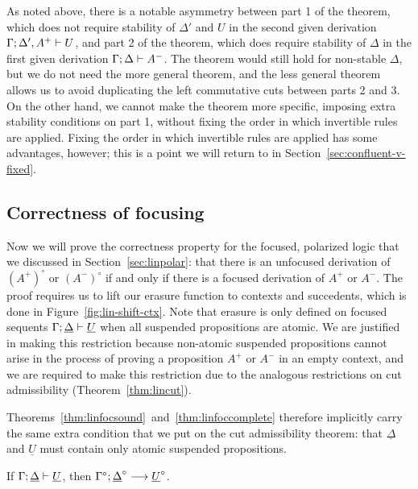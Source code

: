 As noted above, there is a notable asymmetry between part 1 of the
theorem, which does not require stability of $\Delta'$ and $U$ in the
second given derivation ${\Gamma};{\Delta',A^+} \vdash {U} \mathstrut$, and part 2
of the theorem, which does require stability of $\Delta$ in the first
given derivation ${\Gamma};{\Delta} \vdash {A^-} \mathstrut$. The theorem would
still hold for non-stable $\Delta$, but we do not need the more
general theorem, and the less general theorem allows us to avoid
duplicating the left commutative cuts between parts 2 and 3. On the
other hand, we cannot make the theorem more specific, imposing extra
stability conditions on part 1, without fixing the order in which
invertible rules are applied. Fixing the order in which invertible
rules are applied has some advantages, however; this is a point we
will return to in Section~\ref{sec:confluent-v-fixed}.

\subsection{Correctness of focusing}
\label{sec:lincorrectness}



Now we will prove the correctness property for the focused, polarized
logic that we discussed in Section~\ref{sec:linpolar}: that there is
an unfocused derivation of $(A^+)^\circ$ or $(A^-)^\circ$ if and only
if there is a focused derivation of $A^+$ or $A^-$.  The proof
requires us to lift our erasure function to contexts and succedents,
which is done in Figure~\ref{fig:lin-shift-ctx}. Note that erasure is
only defined on focused sequents
${\Gamma};{\underline{\Delta}} \vdash {\underline{U}} \mathstrut$ when all
suspended propositions are atomic. We are justified in making this
restriction because non-atomic suspended propositions cannot arise in
the process of proving a proposition $A^+$ or $A^-$ in an empty
context, and we are required to make this restriction due to the
analogous restrictions on cut admissibility
(Theorem~\ref{thm:lincut}).

Theorems~\ref{thm:linfocsound}~and~\ref{thm:linfoccomplete} therefore
implicitly carry the same extra condition that we put on the cut
admissibility theorem: that $\underline{\Delta}$ and $\underline{U}$
must contain only atomic suspended propositions.

\bigskip
\begin{theorem}\label{thm:linfocsound}
If ${\Gamma};{\underline{\Delta}} \vdash {\underline{U}} \mathstrut$, 
then ${\Gamma^\circ};{\underline{\Delta}^\circ} \longrightarrow {\underline{U}^\circ} \mathstrut$.
\end{theorem}

